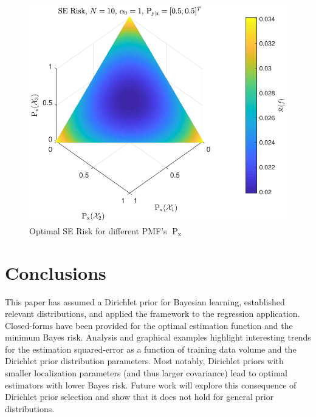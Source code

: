 \documentclass{article}
\DeclareMathOperator{\xrm}{\mathrm{x}}
\DeclareMathOperator{\Prm}{\mathrm{P}}
\begin{document}
\begin{figure}
\centering
\includegraphics[width=1.0\linewidth]{Risk_SE_Dir_IO_Px_N_10_a0_1.pdf}
\caption{Optimal SE Risk for different PMF's $\Prm_{\xrm}$}
\label{fig:Risk_SE_Dir_IO_Px_N_10_a0_1}
\end{figure}





\section{Conclusions}

This paper has assumed a Dirichlet prior for Bayesian learning, established relevant distributions, and applied the framework to the regression application. Closed-forms have been provided for the optimal estimation function and the minimum Bayes risk. Analysis and graphical examples highlight interesting trends for the estimation squared-error as a function of training data volume and the Dirichlet prior distribution parameters. Most notably, Dirichlet priors with smaller localization parameters (and thus larger covariance) lead to optimal estimators with lower Bayes risk. Future work will explore this consequence of Dirichlet prior selection and show that it does not hold for general prior distributions.








\appendix
\end{document}
